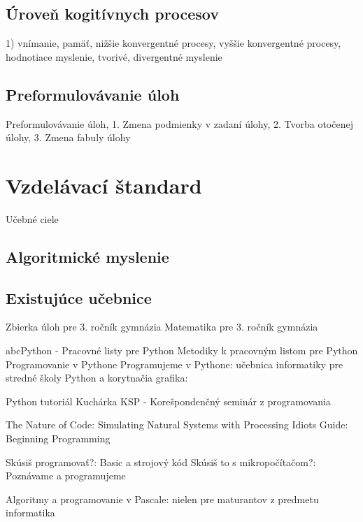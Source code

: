 \subsection{Úroveň kogitívnych procesov}
1) vnímanie, pamäť, nižšie konvergentné procesy, vyššie konvergentné procesy, hodnotiace myslenie, tvorivé, divergentné myslenie \cite{mindakova_tvorba_2008}

\subsection{Preformulovávanie úloh}
Preformulovávanie úloh, 1. Zmena podmienky v zadaní úlohy, 2. Tvorba otočenej úlohy, 3. Zmena fabuly úlohy \cite{mindakova_tvorba_2008}


\section{Vzdelávací štandard}
Učebné ciele \cite{noauthor_statny_2023} \cite{noauthor_statny_2023-1}

\subsection{Algoritmické myslenie}

\subsection{Existujúce učebnice}
Zbierka úloh pre 3. ročník gymnázia \cite{busek_zbierka_1987}
Matematika pre 3. ročník gymnázia \cite{sedivy_matematika_1986}

{abcPython} - {Pracovné} listy pre {Python} \cite{blaho_abcpython_2019}
Metodiky k pracovným listom pre {Python} \cite{blaho_metodiky_2019}
Programovanie v {Pythone} \cite{blaho_programovanie_2016}
Programujeme v {Pythone}: učebnica informatiky pre stredné školy \cite{kucera_programujeme_2016}
Python a korytnačia grafika: \cite{meszarosova_python_2017}

Python tutoriál \cite{korman_python_2020}
Kuchárka {KSP} - {Korešpondenčný} seminár z programovania \cite{noauthor_kucharka_2022}

The {Nature} of {Code}: {Simulating} {Natural} {Systems} with {Processing} \cite{shiffman_nature_2012}
Idiots {Guide}: {Beginning} {Programming} \cite{talles_idiots_2014}

Skúsiš programovať?: {Basic} a strojový kód \cite{wattsova_skusis_1991}
Skúsiš to s mikropočítačom?: {Poznávame} a programujeme \cite{tatchellova_skusis_1990}

Algoritmy a programovanie v {Pascale}: nielen pre maturantov z predmetu informatika \cite{hedvigova_algoritmy_2020}


